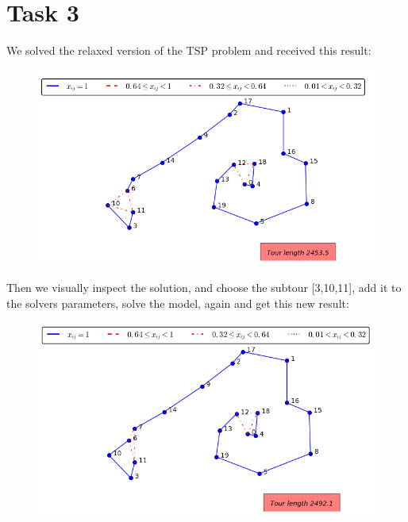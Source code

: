 \documentclass[a4paper,10pt]{article}
\begin{document}
\section*{Task 3}
We solved the relaxed version of the TSP problem and received this result:

\begin{figure}[htb]
\begin{center}
\includegraphics[scale=1.4/textwidth]{task3.1.png}
\end{center}
\end{figure}

Then we visually inspect the solution, and choose the subtour [3,10,11], add it to the solvers parameters, solve the model, again and get this new result:

\begin{figure}[htb]
\begin{center}
\includegraphics[scale=1.4/textwidth]{task3.2.png}
\end{center}
\end{figure}
\end{document}
